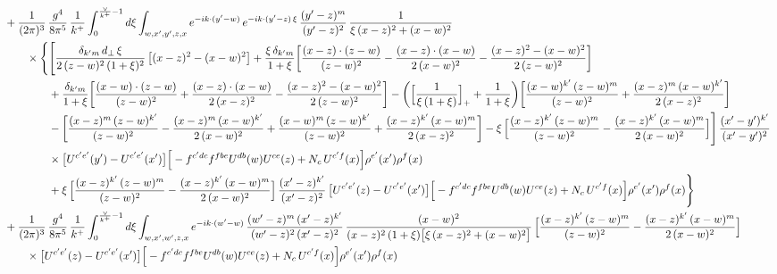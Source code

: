 \documentclass[10pt]{article}
\numberwithin{equation}{section}
\begin{document}
\begin{align}
&+\frac{1}{(2\pi)^{3}}\,\frac{g^{4}}{8\pi^{5}}\,\frac{1}{k^{+}}\int_{0}^{\frac{\vee}{k^{+}}-1}d\xi\int_{w,x^{\prime},y^{\prime},z,x}e^{-ik\cdot (y^{\prime}-w)}\,e^{-ik\cdot (y^{\prime}-z)\,\xi}\,\frac{(y^{\prime}-z)^{m}}{(y^{\prime}-z)^{2}}\,\frac{1}{\xi\,(x-z)^{2}+(x-w)^{2}}\notag\\
&\qquad\times\Bigg\{\Bigg[\frac{\delta_{k^{\prime}m}\,d_{\perp}\,\xi}{2\,(z-w)^{2}\,(1+\xi)^{2}}\left[(x-z)^{2}-(x-w)^{2}\right]+\frac{\xi\,\delta_{k^{\prime}m}}{1+\xi}\bigg[\frac{(x-z)\cdot(z-w)}{(z-w)^{2}}-\frac{(x-z)\cdot(x-w)}{2\,(x-w)^{2}}-\frac{(x-z)^{2}-(x-w)^{2}}{2\,(z-w)^{2}}\bigg]\notag\\
&\qquad\qquad+\frac{\delta_{k^{\prime}m}}{1+\xi}\bigg[\frac{(x-w)\cdot(z-w)}{(z-w)^{2}}+\frac{(x-z)\cdot(x-w)}{2\,(x-z)^{2}}-\frac{(x-z)^{2}-(x-w)^{2}}{2\,(z-w)^{2}}\bigg]
-\bigg(\Big[\frac{1}{\xi\,(1+\xi)}\Big]_{+}+\frac{1}{1+\xi}\bigg)\bigg[\frac{(x-w)^{k^{\prime}}\,(z-w)^{m}}{(z-w)^{2}}+\frac{(x-z)^{m}\,(x-w)^{k^{\prime}}}{2\,(x-z)^{2}}\bigg]\notag\\
&\qquad\qquad-\bigg[\frac{(x-z)^{m}\,(z-w)^{k^{\prime}}}{(z-w)^{2}}-\frac{(x-z)^{m}\,(x-w)^{k^{\prime}}}{2\,(x-w)^{2}}+\frac{(x-w)^{m}\,(z-w)^{k^{\prime}}}{(z-w)^{2}}+\frac{(x-z)^{k^{\prime}}\,(x-w)^{m}}{2\,(x-z)^{2}}\bigg]
-\xi\,\Big[\frac{(x-z)^{k^{\prime}}\,(z-w)^{m}}{(z-w)^{2}}-\frac{(x-z)^{k^{\prime}}\,(x-w)^{m}}{2\,(x-w)^{2}}\Big]\Bigg]\,\frac{(x^{\prime}-y^{\prime})^{k^{\prime}}}{(x^{\prime}-y^{\prime})^{2}}\notag\\
&\qquad\qquad\times\big[U^{c^{\prime}e^{\prime}}(y^{\prime})-U^{c^{\prime}e^{\prime}}(x^{\prime})\big]\Big[-f^{c^{\prime}dc}f^{fbe}U^{db}(w)U^{ce}(z)+N_{c}\,U^{c^{\prime}f}(x)\Big]\rho^{e^{\prime}}(x^{\prime})\rho^{f}(x)\notag\\
&\qquad\qquad+\xi\,\Big[\frac{(x-z)^{k^{\prime}}\,(z-w)^{m}}{(z-w)^{2}}-\frac{(x-z)^{k^{\prime}}\,(x-w)^{m}}{2\,(x-w)^{2}}\Big]\,\frac{(x^{\prime}-z)^{k^{\prime}}}{(x^{\prime}-z)^{2}}\,\big[U^{c^{\prime}e^{\prime}}(z)-U^{c^{\prime}e^{\prime}}(x^{\prime})\big]\Big[-f^{c^{\prime}dc}f^{fbe}U^{db}(w)U^{ce}(z)+N_{c}\,U^{c^{\prime}f}(x)\Big]\rho^{e^{\prime}}(x^{\prime})\rho^{f}(x)\Bigg\}\notag\\
&+\frac{1}{(2\pi)^{3}}\,\frac{g^{4}}{8\pi^{5}}\,\frac{1}{k^{+}}\int_{0}^{\frac{\vee}{k^{+}}-1}d\xi\int_{w,x^{\prime},w^{\prime},z,x}e^{-ik\cdot (w^{\prime}-w)}\,\frac{(w^{\prime}-z)^{m}\,(x^{\prime}-z)^{k^{\prime}}}{(w^{\prime}-z)^{2}\,(x^{\prime}-z)^{2}}\,\frac{(x-w)^{2}}{(x-z)^{2}\,(1+\xi)\big[\xi\,(x-z)^{2}+(x-w)^{2}\big]}\,\Big[\frac{(x-z)^{k^{\prime}}\,(z-w)^{m}}{(z-w)^{2}}-\frac{(x-z)^{k^{\prime}}\,(x-w)^{m}}{2\,(x-w)^{2}}\Big]\notag\\&\qquad\times\big[U^{c^{\prime}e^{\prime}}(z)-U^{c^{\prime}e^{\prime}}(x^{\prime})\big]\Big[-f^{c^{\prime}dc}f^{fbe}U^{db}(w)U^{ce}(z)+N_{c}\,U^{c^{\prime}f}(x)\Big]\rho^{e^{\prime}}(x^{\prime})\rho^{f}(x)\notag\\[6pt]

\end{align}
\end{document}

